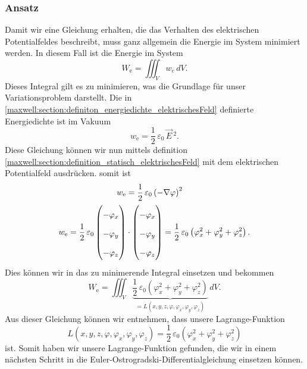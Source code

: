\subsubsection{Ansatz}
Damit wir eine Gleichung erhalten, die das Verhalten des elektrischen Potentialfeldes beschreibt, muss ganz allgemein die Energie im System minimiert werden. 
In diesem Fall ist die Energie im System
\[
W_{\text{e}}
=
\iiint_V w_e\, dV.
\]
Dieses Integral gilt es zu minimieren, was die Grundlage für unser Variationsproblem darstellt.
Die in \eqref{maxwell:section:definiton_energiedichte_elektrischesFeld} definierte Energiedichte ist im Vakuum
\[
w_{\text{e}}
=
\frac{1}{2}\,\varepsilon_0\,\vec{E}\,^2.
\]
Diese Gleichung können wir nun mittels definition \eqref{maxwell:section:definition_statisch_elektrischesFeld} mit dem elektrischen Potentialfeld ausdrücken.
somit ist
\begin{align}
\renewcommand{\arraystretch}{1.9}
w_{\text{e}}
&=
\frac{1}{2}\,\varepsilon_0\left(-\nabla\varphi\right)^2
\\
w_{\text{e}}
=
\frac{1}{2}\,\varepsilon_0
\begin{pmatrix}
\displaystyle
-\varphi_x\\
\displaystyle
-\varphi_y\\
\displaystyle
-\varphi_z
\end{pmatrix}
&\cdot
\begin{pmatrix}
\displaystyle
-\varphi_x\\
\displaystyle
-\varphi_y\\
\displaystyle
-\varphi_z
\end{pmatrix}
=
\frac{1}{2}\,\varepsilon_0\left(\varphi_x^2 + \varphi_y^2 + \varphi_z^2\right).
\label{maxwell:section:energiedichte}
\end{align}
Dies können wir in das zu minimerende Integral einsetzen und bekommen
\begin{equation}
	W_{\text{e}}
	=
	\iiint_V \underbrace{
		\frac{1}{2}\,\varepsilon_0\left(\varphi_x^2 + \varphi_y^2 + \varphi_z^2\right)}_{\displaystyle=L(x,y,z,\varphi,\varphi_x,\varphi_y,\varphi_z)}\, dV.
	\label{maxwell:section:energieintegral_quellenfrei}
\end{equation}
Aus dieser Gleichung können wir entnehmen, dass unsere Lagrange-Funktion
\begin{equation}
	L(x,y,z,\varphi,\varphi_x,\varphi_y,\varphi_z)
	=
	\frac{1}{2}\,\varepsilon_0\left(\varphi_x^2 + \varphi_y^2 + \varphi_z^2\right)
	\label{maxwell:section:lagrangefunktion_quellenfrei}
\end{equation}
ist.
Somit haben wir unsere Lagrange-Funktion gefunden, die wir in einem nächsten Schritt in die Euler-Ostrogradski-Differentialgleichung einsetzen können.

